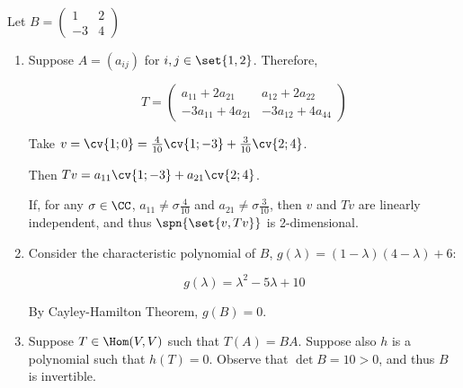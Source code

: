 \documentclass[11pt]{scrartcl}
\begin{document}
Let $B =
\begin{pmatrix}
  1 & 2\\
  -3 & 4
\end{pmatrix}$
  \begin{enumerate}[label=\alph*)]
  \item

    Suppose $A = (a_{ij})$ for $i,j \in \set{1,2}$. Therefore,

    \begin{equation*}
      T=
      \begin{pmatrix}
        a_{11}+2a_{21}   & a_{12}+2a_{22} \\
        -3a_{11}+4a_{21} & -3a_{12}+4a_{44}
      \end{pmatrix}
    \end{equation*}


    Take $v = \cv{1;0} = \frac{4}{10}\cv{1;-3} + \frac{3}{10}\cv{2;4} $.

    Then $Tv = a_{11}\cv{1;-3} + a_{21}\cv{2;4} $.

    If, for any $\sigma\in \CC$, $a_{11}\neq \sigma\frac{4}{10}$ and
    $a_{21}\neq \sigma \frac{3}{10}$, then $v$ and $Tv$ are linearly
    independent, and thus $\spn{\set{v, Tv}}$ is 2-dimensional.

\item
\label{item:1}
Consider the characteristic polynomial of $B$,
$g(\lambda) = (1-\lambda)(4-\lambda) + 6$:

  \begin{equation*}
    g(\lambda) = \lambda^2-5\lambda +10
  \end{equation*}

  By Cayley-Hamilton Theorem, $g(B) = 0$.
\item

  Suppose $T \in \Hom(V,V)$ such that $T(A) = BA$. Suppose also $h$ is
  a polynomial such that $h(T) = 0$. Observe that $\det B = 10 > 0$,
  and thus $B$ is invertible.%


\end{enumerate}
\end{document}
